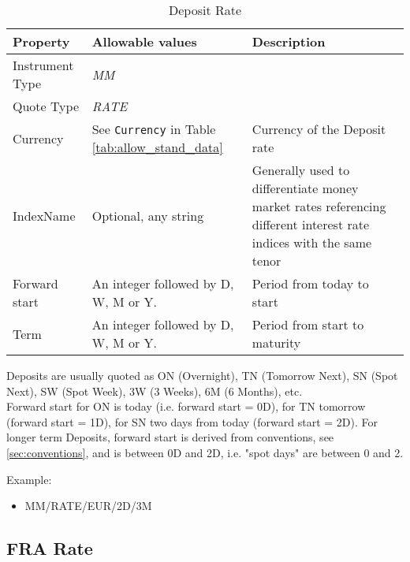 \begin{table}[H]
\centering
  \begin{tabular}{|p{3cm}|p{3.5cm}|p{7cm}|}
  \hline
    {\bf Property} & {\bf Allowable values} & {\bf Description} \\ \hline
    Instrument Type & \emph{MM} & \\ \hline
    Quote Type & \emph{RATE} & \\ \hline
    Currency & See \lstinline!Currency! in Table \ref{tab:allow_stand_data} & Currency of the Deposit rate\\ \hline
    IndexName & Optional, any string & Generally used to differentiate money market rates referencing different interest rate indices with the same tenor\\ \hline
    Forward start & An integer followed by D, W, M or Y.  & Period from today to start \\ \hline
    Term & An integer followed by D, W, M or Y. & Period from start to maturity\\ \hline
  \end{tabular}
  \caption{Deposit Rate}
  \label{tab:deposit_quote}
\end{table}


Deposits are usually quoted as ON (Overnight), TN (Tomorrow Next), SN
(Spot Next), SW (Spot Week), 3W (3 Weeks), 6M (6 Months), etc. \\

Forward start for ON is today (i.e. forward start = 0D), for TN tomorrow (forward start = 1D), for SN two days from
today (forward start = 2D). For longer term Deposits, forward start is derived from conventions, see 
\ref{sec:conventions}, and is between 0D and 2D, i.e. "spot days" are between 0 and 2.

\medskip
Example:
\begin{itemize}
\item {MM/RATE/EUR/2D/3M}
\end{itemize}

\subsection{FRA Rate}

